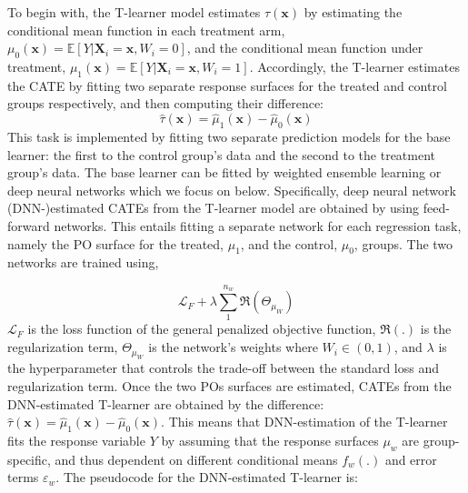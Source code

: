 To begin with, the T-learner model estimates
\(\tau\left(\mathbf{x}\right)\) by estimating the conditional mean
function in each treatment arm,
\(\mu_{0}\left(\mathbf{x}\right)=\mathbb{E}\left[ Y|\mathbf{X}_{i}=\mathbf{x}, W_{i}=0\right]\),
and the conditional mean function under treatment,
\(\mu_{1}\left(\mathbf{x}\right)=\mathbb{E}\left[ Y|\mathbf{X}_{i}=\mathbf{x}, W_{i}=1 \right]\).
Accordingly, the T-learner estimates the CATE by fitting two separate
response surfaces for the treated and control groups respectively, and
then computing their difference: \begin{equation}
\widehat{\tau}\left(\mathbf{x}\right)=\widehat{\mu}_{1}\left(\mathbf{x}\right)-\widehat{\mu}_{0}\left(\mathbf{x}\right)
\end{equation} This task is implemented by fitting two separate
prediction models for the base learner: the first to the control group's
data and the second to the treatment group's data. The base learner can
be fitted by weighted ensemble learning or deep neural networks which we
focus on below. Specifically, deep neural network (DNN-)estimated CATEs
from the T-learner model are obtained by using feed-forward networks.
This entails fitting a separate network for each regression task, namely
the PO surface for the treated, \(\mu_{1}\), and the control, \(\mu_{0}\),
groups. The two networks are trained using,

\begin{equation}
\mathcal{L}_{F}+\lambda\sum\limits_{1}^{n_w}\Re\left(\Theta_{\mu_{W}}\right)
\end{equation}
\(\mathcal{L}_{F}\) is the loss function of the general penalized
objective function, \(\mathcal{\mathcal{\Re}}\left(.\right)\) is the
regularization term, \(\Theta_{\mu_{W}}\) is the network's weights where
\(W_{i}\in\left(0,1\right)\), and \(\lambda\) is the hyperparameter that
controls the trade-off between the standard loss and regularization
term. Once the two POs surfaces are estimated, CATEs from the
DNN-estimated T-learner are obtained by the difference:
\(\widehat{\tau}\left(\mathbf{x}\right)=\widehat{\mu}_{1}\left(\mathbf{x}\right)-\widehat{\mu}_{0} \left(\mathbf{x}\right)\).
This means that DNN-estimation of the T-learner fits the response
variable \(Y\) by assuming that the response surfaces \(\mu_{w}\) are
group-specific, and thus dependent on different conditional means
\(f_{w}\left(.\right)\) and error terms \(\varepsilon_{w}\). The pseudocode
for the DNN-estimated T-learner is:

